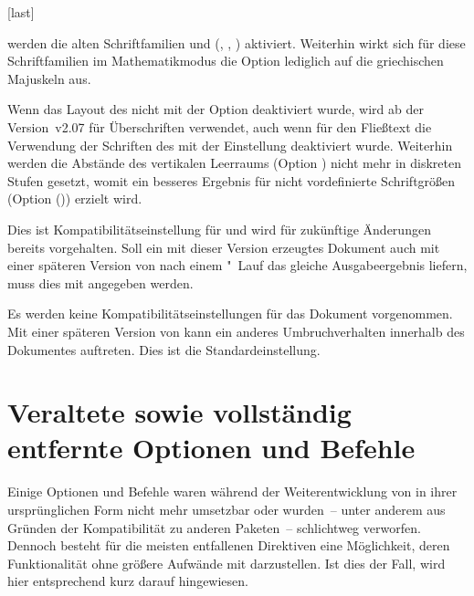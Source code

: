 \begin{Declaration}[v2.03]{}[last]
\begin{values}{}
  werden die alten Schriftfamilien \Univers und \DIN 
  (, , )
  aktiviert. Weiterhin wirkt sich für diese Schriftfamilien im Mathematikmodus 
  die Option  lediglich auf die griechischen 
  Majuskeln aus.
\item[\PValue{2.06}]
  Wenn das Layout des \CDs nicht mit der Option  deaktiviert 
  wurde, wird ab der Version~v2.07 für Überschriften \OpenSans verwendet, auch 
  wenn für den Fließtext die Verwendung der Schriften des \CDs mit der 
  Einstellung  deaktiviert wurde. Weiterhin werden die 
  Abstände des vertikalen Leerraums (Option ) nicht 
  mehr in diskreten Stufen gesetzt, womit ein besseres Ergebnis für nicht 
  vordefinierte Schriftgrößen (Option ()) 
  erzielt wird.
\item[\PValue{2.07}]
  Dies ist Kompatibilitätseinstellung für \vTUDScript*{\TUDScript} und wird für 
  zukünftige Änderungen bereits vorgehalten. Soll ein mit dieser Version 
  erzeugtes Dokument auch mit einer späteren Version von \TUDScript nach einem 
  "~Lauf das gleiche Ausgabeergebnis liefern, muss dies mit 
   angegeben werden.
\item[\PValue{last}]
  Es werden keine Kompatibilitätseinstellungen für das Dokument vorgenommen. 
  Mit einer späteren Version von \TUDScript kann ein anderes Umbruchverhalten 
  innerhalb des Dokumentes auftreten. Dies ist die Standardeinstellung.
\end{values}
\end{Declaration}



\section{%
  Veraltete sowie vollständig entfernte Optionen und Befehle%
}
Einige Optionen und Befehle waren während der Weiterentwicklung von \TUDScript
in ihrer ursprünglichen Form nicht mehr umsetzbar oder wurden~-- unter anderem 
aus Gründen der Kompatibilität zu anderen Paketen~-- schlichtweg verworfen. 
Dennoch besteht für die meisten entfallenen Direktiven eine Möglichkeit, deren 
Funktionalität ohne größere Aufwände mit \vTUDScript*{\TUDScript} darzustellen. 
Ist dies der Fall, wird hier entsprechend kurz darauf hingewiesen.

